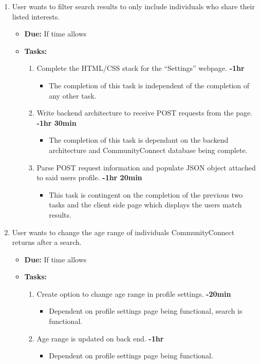 \documentclass[12pt]{article}
\begin{document}
\begin{enumerate}
    \item User wants to filter search results to only include individuals who share their listed interests.
      \begin{itemize}
        \item \textbf{Due:} If time allows
        \item \textbf{Tasks:}
          \begin{enumerate}
            \item Complete the HTML/CSS stack for the “Settings” webpage. \textbf{-1hr}
              \begin{itemize}
                \item The completion of this task is independent of the completion of any other task.
              \end{itemize}
            \item Write backend architecture to receive POST requests from the page. \textbf{-1hr 30min}
              \begin{itemize}
                \item The completion of this task is dependant on the backend architecture and CommunityConnect database being complete.
              \end{itemize}
            \item Parse POST request information and populate JSON object attached to said users profile. \textbf{-1hr 20min}
              \begin{itemize}
                \item This task is contingent on the completion of the previous two tasks and the client side page which displays the users match results.
              \end{itemize}
          \end{enumerate}
      \end{itemize}

    \item  User wants to change the age range of individuals CommunityConnect returns after a search.
      \begin{itemize}
        \item \textbf{Due:} If time allows
        \item \textbf{Tasks:}
          \begin{enumerate}
            \item Create option to change age range in profile settings. \textbf{-20min}
              \begin{itemize}
                \item Dependent on profile settings page being functional, search is functional.
              \end{itemize}
            \item Age range is updated on back end. \textbf{-1hr}
              \begin{itemize}
                \item Dependent on profile settings page being functional.
              \end{itemize}
          \end{enumerate}
      \end{itemize}


\end{enumerate}
\end{document}
